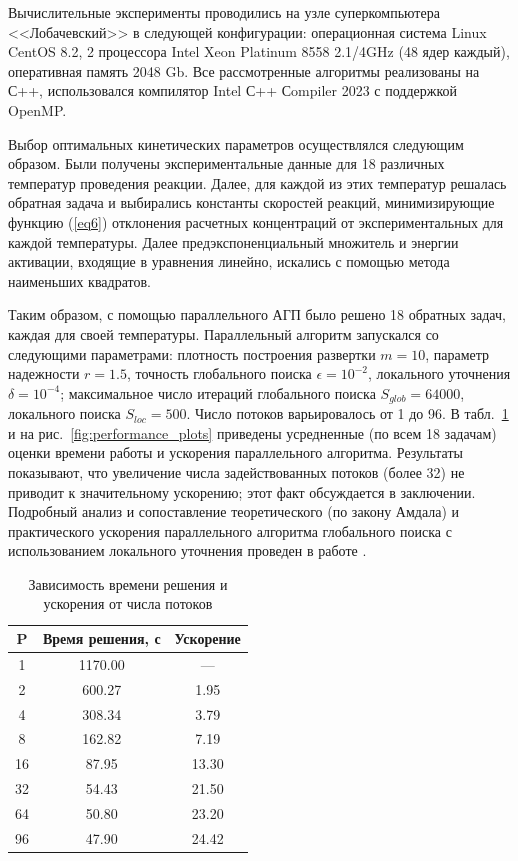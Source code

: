\documentclass{cmi}
\begin{document}
Вычислительные эксперименты проводились на узле суперкомпьютера <<Лобачевский>> в следующей конфигурации: операционная система Linux CentOS 8.2, 2 процессора Intel Xeon Platinum 8558 2.1/4GHz (48 ядер каждый), оперативная память 2048 Gb. 
Все рассмотренные алгоритмы реализованы на С++, использовался компилятор Intel С++ Сompiler 2023 с поддержкой OpenMP.

Выбор оптимальных кинетических параметров осуществлялся следующим образом. Были получены экспериментальные данные для 18 различных температур проведения реакции. Далее, для каждой из этих температур решалась обратная задача и выбирались константы скоростей реакций, минимизирующие функцию (\ref{eq6}) отклонения расчетных концентраций от экспериментальных для каждой температуры. Далее предэкспоненциальный множитель и энергии активации, входящие в уравнения линейно, искались с помощью метода наименьших квадратов.

Таким образом, с помощью параллельного АГП было решено 18 обратных задач, каждая для своей температуры.
Параллельный алгоритм запускался со следующими параметрами: плотность построения развертки $m=10$, параметр надежности $r=1.5$, точность глобального поиска $\epsilon = 10^{-2}$, локального уточнения $\delta = 10^{-4}$; максимальное число итераций глобального поиска $S_{glob} = 64 000$, локального поиска $S_{loc} = 500$. Число потоков варьировалось от 1 до 96.
В табл.~\ref{tab:scalability} и на рис.~\ref{fig:performance_plots} приведены усредненные (по всем 18 задачам) оценки времени работы и ускорения параллельного алгоритма. Результаты показывают, что увеличение числа задействованных потоков (более 32) не приводит к значительному ускорению; этот факт обсуждается в заключении.
Подробный анализ и сопоставление теоретического (по закону Амдала) и практического ускорения параллельного алгоритма глобального поиска с использованием локального уточнения проведен в работе .

\begin{table}[h]
\noindent
\caption{Зависимость времени решения и ускорения от числа потоков}
\label{tab:scalability}
\centering
\begin{tabular}{|c|c|c|}
\hline
\textbf{P} & \textbf{Время решения, с} & \textbf{Ускорение} \\
\hline
1   & 1170.00  & --- \\
2   & 600.27  & 1.95 \\
4   & 308.34  & 3.79 \\
8   & 162.82  & 7.19 \\
16  & 87.95   & 13.30 \\
32  & 54.43   & 21.50 \\
64  & 50.80   & 23.20 \\
96  & 47.90   & 24.42 \\
\hline
\end{tabular}
\end{table}
\end{document}

